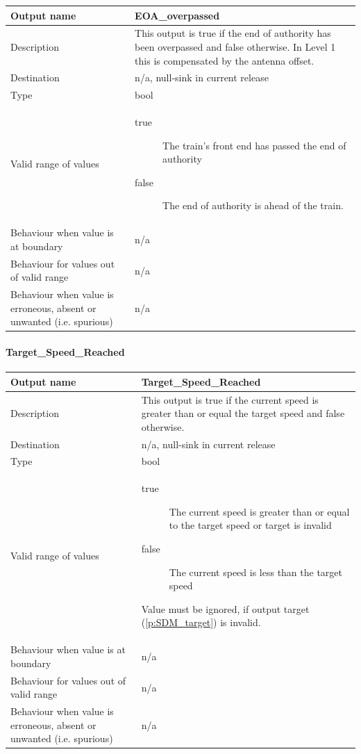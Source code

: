 \begin{longtable}{p{}p{}}
\toprule
Output name				& EOA\_overpassed \\
\midrule
Description				& This output is true if the end of authority has been overpassed and false otherwise. In Level 1 this is compensated by the antenna offset.\\
\midrule
Destination				& n/a, null-sink in current release \\ 
\midrule
Type					& bool \\
\midrule
Valid range of values	& \begin{description}
                            \item[true] The train's front end has passed the end of authority
                            \item[false] The end of authority is ahead of the train.
                          \end{description}\\
\midrule
Behaviour when value is at boundary	& n/a \\
\midrule
Behaviour for values out of valid range	& n/a \\
\midrule
Behaviour when value is erroneous, absent or unwanted (i.e. spurious) & n/a \\
\bottomrule
\end{longtable}


\paragraph{Target\_Speed\_Reached}

\begin{longtable}{p{}p{}}
\toprule
Output name				& Target\_Speed\_Reached \\
\midrule
Description				& This output is true if the current speed is greater than or equal the target speed and false otherwise. \\
\midrule
Destination				& n/a, null-sink in current release \\ 
\midrule
Type					& bool \\
\midrule
Valid range of values	&
\begin{description}
\item[true] The current speed is greater than or equal to the target speed or target is invalid
\item[false] The current speed is less than the target speed
\end{description}
Value must be ignored, if output target (\ref{p:SDM_target}) is invalid.\\
\midrule
Behaviour when value is at boundary	& n/a \\
\midrule
Behaviour for values out of valid range	& n/a \\
\midrule
Behaviour when value is erroneous, absent or unwanted (i.e. spurious) & n/a \\
\bottomrule
\end{longtable}


